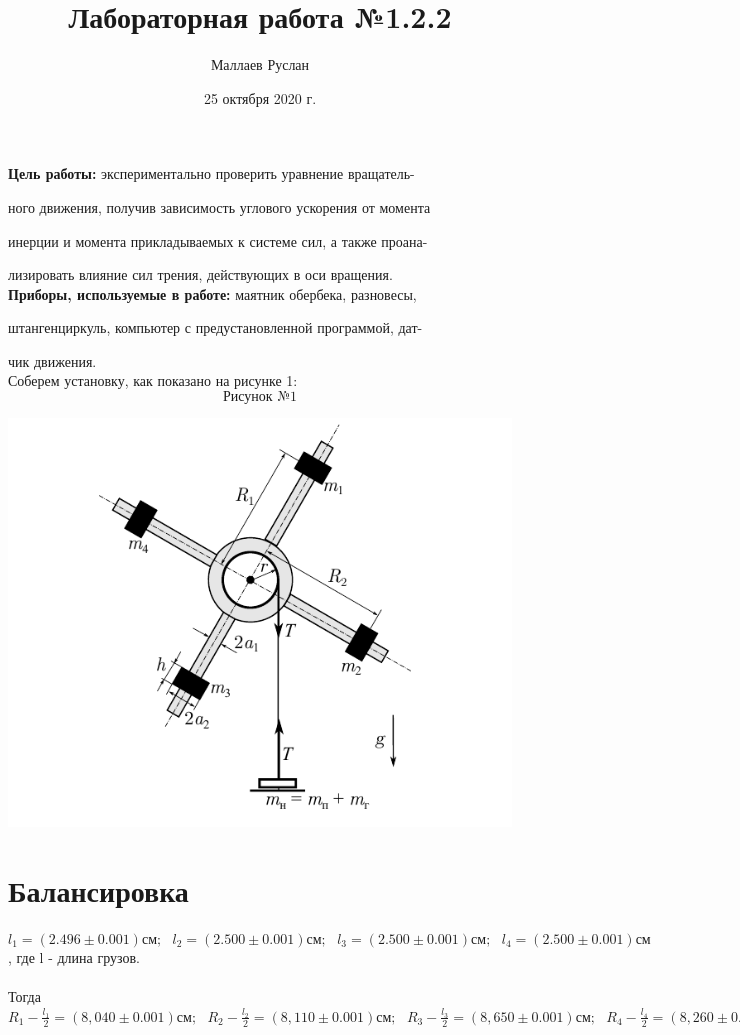 \documentclass[a4paper,12pt]{article} %
\author{Маллаев Руслан}
\title{Лабораторная работа №1.2.2}
\date{25 октября 2020 г.}
\begin{document}

\maketitle
\newpage
 
 \textbf{Цель работы:}  экспериментально проверить уравнение вращатель-
 
 ного движения, получив зависимость углового ускорения от момента
 
 инерции и момента 
прикладываемых к системе сил, а также проана-

лизировать влияние сил трения, действующих в оси вращения.
\\

\textbf{Приборы, используемые в работе:} маятник обербека, разновесы,

штангенциркуль, компьютер с предустановленной программой, дат-

чик движения.\\


Соберем установку, как показано на рисунке 1:
\[\text{Рисунок №1}\]
\begin{center}
\includegraphics[scale=0.89]{обербексхема}
\end{center}

\newpage
\section{Балансировка}
$l_1 = (2.496\pm0.001)\text{см};\text{ }l_2 = (2.500\pm0.001)\text{см};\text{ }l_3 = (2.500\pm0.001)\text{см};\text{ }l_4 = (2.500\pm0.001)\text{см}$, где l - длина грузов.\\\\
Тогда $R_1 - \frac{l_1}{2} = (8,040\pm0.001)\text{см};\text{ }R_2 - \frac{l_2}{2} = (8,110\pm0.001)\text{см};\text{ }R_3 - \frac{l_3}{2} = (8,650\pm0.001)\text{см};\text{ }R_4 - \frac{l_4}{2} = (8,260\pm0.001)\text{см};\text{ }$
\end{document}
